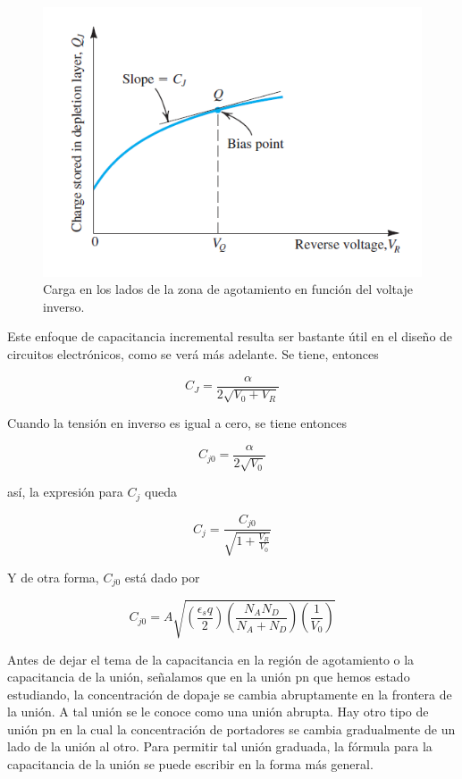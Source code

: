 \begin{figure}[H]
    \centering
    \includegraphics[scale=0.6]{Electronica/pn_f7.png}
    \caption{Carga en los lados de la zona de agotamiento en función del voltaje inverso.}
    \label{fig_CargaQjEnFunciondelVoltajeInverso}
\end{figure}

Este enfoque de capacitancia incremental resulta ser bastante útil en el diseño de circuitos electrónicos, como se verá más adelante.
Se tiene, entonces

\begin{equation*}
C_J = \frac{\alpha}{2 \sqrt{V_0 + V_R}}
\end{equation*}

Cuando la tensión en inverso es igual a cero, se tiene entonces

\begin{equation*}
C_{j0} = \frac{\alpha}{2 \sqrt{V_0}}
\end{equation*}

así, la expresión para $C_j$ queda

\begin{equation*}
C_j = \frac{C_{j0}}{\sqrt{1+ \frac{V_R}{V_0}}}
\end{equation*}

Y de otra forma, $C_{j0}$ está dado por

\begin{equation*}
C_{j0} = A \sqrt{\left( \frac{\epsilon_s q}{2} \right)\left( \frac{N_A N_D}{N_A + N_D} \right)\left( \frac{1}{V_0} \right)}
\end{equation*}

Antes de dejar el tema de la capacitancia en la región de agotamiento o la capacitancia de la unión, señalamos que en la unión pn que hemos estado estudiando, la concentración de dopaje se cambia abruptamente en la frontera de la unión. A tal unión se le conoce como una unión abrupta. Hay otro tipo de unión pn en la cual la concentración de portadores se cambia gradualmente de un lado de la unión al otro. Para permitir tal unión graduada, la fórmula para la capacitancia de la unión se puede escribir en la forma más general.

